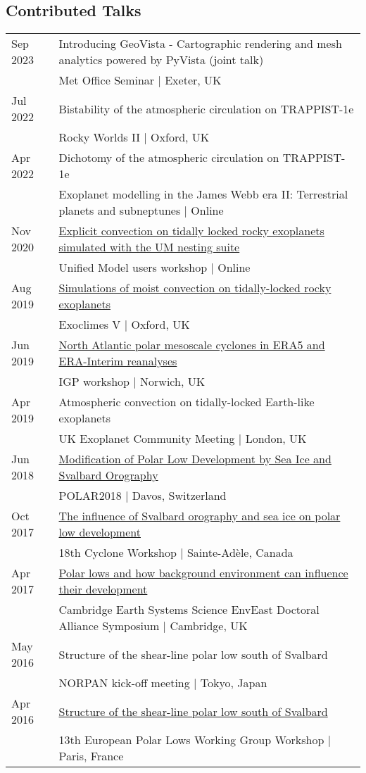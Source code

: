 \documentclass[a4paper, 11pt]{article}
\begin{document}
\subsection*{Contributed Talks}
\begin{tabularx}{\linewidth}{@{}l X@{}}
Sep 2023 & Introducing GeoVista - Cartographic rendering and mesh analytics powered by PyVista (joint talk) \\ & Met Office Seminar | Exeter, UK \\
Jul 2022 & Bistability of the atmospheric circulation on TRAPPIST-1e \\ & Rocky Worlds II | Oxford, UK \\
Apr 2022 & Dichotomy of the atmospheric circulation on TRAPPIST-1e \\ & Exoplanet modelling in the James Webb era II: Terrestrial planets and subneptunes | Online \\
Nov 2020 & \href{https://slides.com/denissergeev/2020-11-10-um-workshop-sergeev}{Explicit convection on tidally locked rocky exoplanets simulated with the UM nesting suite} \\ & Unified Model users workshop | Online \\
Aug 2019 & \href{https://youtu.be/9nGIpQiPwDs}{Simulations of moist convection on tidally-locked rocky exoplanets} \\ & Exoclimes V | Oxford, UK \\
Jun 2019 & \href{https://speakerdeck.com/dennissergeev/north-atlantic-polar-mesoscale-cyclones-in-era5-and-era-interim-reanalyses}{North Atlantic polar mesoscale cyclones in ERA5 and ERA-Interim reanalyses} \\ & IGP workshop | Norwich, UK \\
Apr 2019 & Atmospheric convection on tidally-locked Earth-like exoplanets \\ & UK Exoplanet Community Meeting | London, UK \\
Jun 2018 & \href{https://speakerdeck.com/dennissergeev/polar2018}{Modification of Polar Low Development by Sea Ice and Svalbard Orography} \\ & POLAR2018 | Davos, Switzerland \\
Oct 2017 & \href{https://figshare.com/articles/The_influence_of_Svalbard_orography_and_sea_ice_on_polar_low_development/5510416}{The influence of Svalbard orography and sea ice on polar low development} \\ & 18th Cyclone Workshop | Sainte-Adèle, Canada \\
Apr 2017 & \href{http://dennissergeev.github.io/ceeda2017}{Polar lows and how background environment can influence their development} \\ & Cambridge Earth Systems Science EnvEast Doctoral Alliance Symposium | Cambridge, UK \\
May 2016 & Structure of the shear-line polar low south of Svalbard \\ & NORPAN kick-off meeting | Tokyo, Japan \\
Apr 2016 & \href{http://slides.com/denissergeev/deck}{Structure of the shear-line polar low south of Svalbard} \\ & 13th European Polar Lows Working Group Workshop | Paris, France \\
\end{tabularx}
\end{document}
